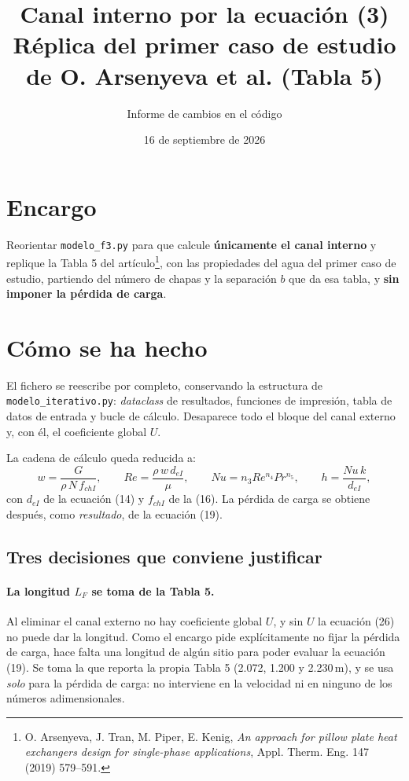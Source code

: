 \documentclass[11pt,a4paper]{article}
\title{Canal interno por la ecuación (3)\\
       \large Réplica del primer caso de estudio de O. Arsenyeva et al. (Tabla 5)}
\author{Informe de cambios en el código}
\date{16 de septiembre de 2026}
\begin{document}
\maketitle

\section{Encargo}

Reorientar \texttt{modelo\_f3.py} para que calcule \textbf{únicamente el canal interno} y
replique la Tabla 5 del artículo\footnote{O. Arsenyeva, J. Tran, M. Piper, E. Kenig,
\emph{An approach for pillow plate heat exchangers design for single-phase applications},
Appl. Therm. Eng. 147 (2019) 579--591.}, con las propiedades del agua del primer caso de
estudio, partiendo del número de chapas y la separación $b$ que da esa tabla, y \textbf{sin
imponer la pérdida de carga}.

\section{Cómo se ha hecho}

El fichero se reescribe por completo, conservando la estructura de
\texttt{modelo\_iterativo.py}: \emph{dataclass} de resultados, funciones de impresión, tabla de
datos de entrada y bucle de cálculo. Desaparece todo el bloque del canal externo y, con él, el
coeficiente global $U$.

La cadena de cálculo queda reducida a:
\begin{equation}
  w = \frac{G}{\rho\,N\,f_{chI}},\qquad
  Re = \frac{\rho\,w\,d_{eI}}{\mu},\qquad
  Nu = n_3 Re^{n_4} Pr^{n_5},\qquad
  h = \frac{Nu\,k}{d_{eI}},
\end{equation}
con $d_{eI}$ de la ecuación (14) y $f_{chI}$ de la (16). La pérdida de carga se obtiene
después, como \emph{resultado}, de la ecuación (19).

\subsection{Tres decisiones que conviene justificar}

\paragraph{La longitud $L_F$ se toma de la Tabla 5.} Al eliminar el canal externo no hay
coeficiente global $U$, y sin $U$ la ecuación (26) no puede dar la longitud. Como el encargo
pide explícitamente no fijar la pérdida de carga, hace falta una longitud de algún sitio para
poder evaluar la ecuación (19). Se toma la que reporta la propia Tabla 5 (2.072, 1.200 y
2.230\,m), y se usa \emph{solo} para la pérdida de carga: no interviene en la velocidad ni en
ninguno de los números adimensionales.
\end{document}

